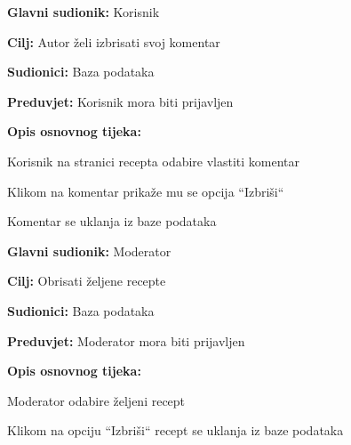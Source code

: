\noindent {}
\begin{packed_item}

	\item \textbf{Glavni sudionik: } Korisnik
	\item  \textbf{Cilj:} Autor želi izbrisati svoj komentar
	\item  \textbf{Sudionici:} Baza podataka
	\item  \textbf{Preduvjet:} Korisnik mora biti prijavljen
	\item  \textbf{Opis osnovnog tijeka:}

	\item[] \begin{packed_enum}

		\item Korisnik na stranici recepta odabire vlastiti komentar
		\item Klikom na komentar prikaže mu se opcija “Izbriši“
		\item Komentar se uklanja iz baze podataka
	\end{packed_enum}
\end{packed_item}

\noindent {}
\begin{packed_item}

	\item \textbf{Glavni sudionik: } Moderator
	\item  \textbf{Cilj:} Obrisati željene recepte
	\item  \textbf{Sudionici:} Baza podataka
	\item  \textbf{Preduvjet:} Moderator mora biti prijavljen
	\item  \textbf{Opis osnovnog tijeka:}

	\item[] \begin{packed_enum}

		\item Moderator odabire željeni recept
		\item Klikom na opciju “Izbriši“ recept se uklanja iz baze podataka
	\end{packed_enum}
\end{packed_item}

